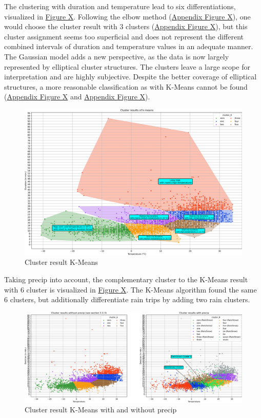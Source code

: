 The clustering with duration and temperature lead to six differentiations, visualized in \hyperref[FINAL_Cluster_KMEANS_Duration_Temp]{Figure X}. Following the elbow method (\hyperref[Loss_Duration_Temp]{Appendix Figure X}), one would choose the cluster result with 3 clusters (\hyperref[Cluster_KMEANS_Duration_Temp]{Appendix Figure X}), but this cluster assignment seems too superficial and does not represent the different combined intervals of duration and temperature values in an adequate manner. The Gaussian model adds a new perspective, as the data is now largely represented by elliptical cluster structures. The clusters leave a large scope for interpretation and are highly subjective. Despite the better coverage of elliptical structures, a more reasonable classification as with K-Means cannot be found (\hyperref[Silhouette_Gaussian_Duration_Temp]{Appendix Figure X} and \hyperref[Clusters_Gaussian_Duration_Temp]{Appendix Figure X}).

\begin{figure}[H]
   \centering
    \includegraphics[width=0.8\linewidth]{./Figures/FINAL_Cluster_KMEANS_Duration_Temp.png}
    \caption{Cluster result K-Means}
    \label{FINAL_Cluster_KMEANS_Duration_Temp}
\end{figure}

Taking precip into account, the complementary cluster to the K-Means result with 6 cluster is visualized in \hyperref[FINAL_Cluster_Duration_Temp_Precip]{Figure X}. The K-Means algorithm found the same 6 clusters, but additionally differentiate rain trips by adding two rain clusters.\\

\begin{figure}[H]
   \centering
    \includegraphics[width=1\linewidth]{./Figures/FINAL_Cluster_Duration_Temp_Precip.png}
    \caption{Cluster result K-Means with and without precip}
    \label{FINAL_Cluster_Duration_Temp_Precip}
\end{figure}

